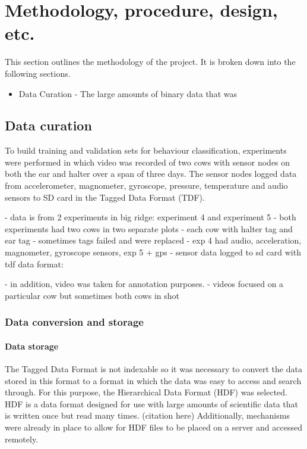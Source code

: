 \chapter{Methodology, procedure, design, etc.}

This section outlines the methodology of the project. It is broken down into the following sections. 

\begin{itemize}
\item Data Curation - The large amounts of binary data that was
\end{itemize}

\section{Data curation}

To build training and validation sets for behaviour classification, experiments were performed in which video was recorded of two cows with sensor nodes on both the ear and halter over a span of three days. The sensor nodes logged data from accelerometer, magnometer, gyroscope, pressure, temperature and audio sensors to SD card in the Tagged Data Format (TDF). 

- data is from 2 experiments in big ridge: experiment 4 and experiment 5
	- both experiments had two cows in two separate plots
		- each cow with halter tag and ear tag	
		- sometimes tags failed and were replaced	
	- exp 4 had audio, acceleration, magnometer, gyroscope sensors, exp 5 + gps	
	- sensor data logged to sd card with tdf data format: %
	
- in addition, video was taken for annotation purposes.
	- videos focused on a particular cow but sometimes both cows in shot

\subsection{Data conversion and storage}

\subsubsection{Data storage}
The Tagged Data Format is not indexable so it was necessary to convert the data stored in this format to a format in which the data was easy to access and search through. For this purpose, the Hierarchical Data Format (HDF) was selected. HDF is a data format designed for use with large amounts of scientific data that is written once but read many times. (citation here) Additionally, mechanisms were already in place to allow for HDF files to be placed on a server and accessed remotely. 

